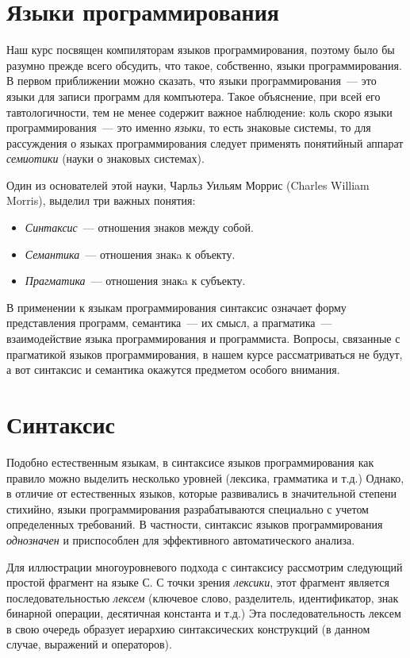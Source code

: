 \documentclass{article}
\begin{document}
\section{Языки программирования}

Наш курс посвящен компиляторам языков программирования, поэтому было бы разумно прежде всего обсудить, что такое, собственно,
языки программирования. В первом приближении можно сказать, что языки программирования~--- это языки для записи программ для компъютера.
Такое объяснение, при всей его тавтологичности, тем не менее содержит важное наблюдение: коль скоро языки программирования~--- это именно \emph{языки},
то есть знаковые системы, то для рассуждения о языках программирования следует применять понятийный аппарат \emph{семиотики} (науки о
знаковых системах).

Один из основателей этой науки, Чарльз Уильям Моррис (Charles William Morris), выделил три важных понятия:

\begin{itemize}
\item \emph{Синтаксис}~--- отношения знаков между собой.
\item \emph{Семантика}~--- отношения знакa к объекту.
\item \emph{Прагматика}~--- отношения знакa к субъекту.
\end{itemize}

В применении к языкам программирования синтаксис означает форму представления программ, семантика~--- их смысл, а прагматика~--- взаимодействие
языка программирования и программиста. Вопросы, связанные с прагматикой языков программирования, в нашем курсе рассматриваться не будут, а
вот синтаксис и семантика окажутся предметом особого внимания.

\section{Синтаксис}

Подобно естественным языкам, в синтаксисе языков программирования как правило можно выделить несколько уровней (лексика, грамматика и т.д.) Однако, в отличие
от естественных языков, которые развивались в значительной степени стихийно, языки программирования разрабатываются специально с
учетом определенных требований. В частности, синтаксис языков программирования \emph{однозначен} и приспособлен для эффективного автоматического анализа.

Для иллюстрации многоуровневого подхода с синтаксису рассмотрим следующий простой фрагмент на языке С. С точки зрения
\emph{лексики}, этот фрагмент является последовательностью \emph{лексем} (ключевое слово, разделитель, идентификатор, знак бинарной операции, десятичная константа и т.д.)
Эта последовательность лексем в свою очередь образует иерархию синтаксических конструкций (в данном случае, выражений и операторов).
\end{document}
